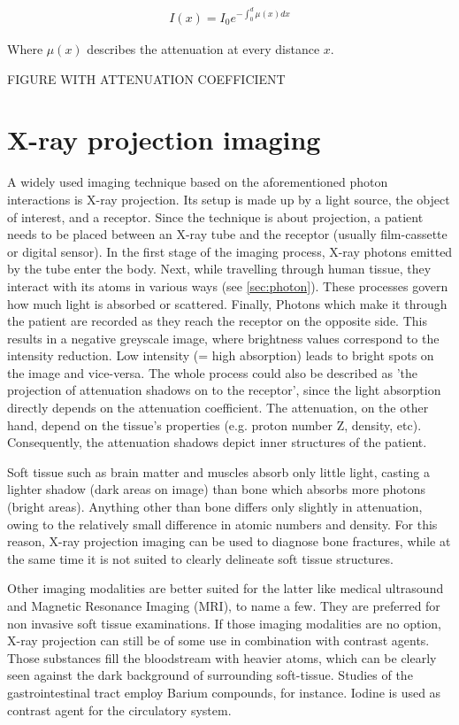 \begin{align}
\label{eq:mu_int}
I(x) = I_0 e^{- \int_{0}^{d} \mu(x)dx}
\end{align}

Where $\mu(x)$ describes the attenuation at every distance $x$.

FIGURE WITH ATTENUATION COEFFICIENT



\section{X-ray projection imaging}
A widely used imaging technique based on the aforementioned photon interactions is X-ray projection.
Its setup is made up by a light source, the object of interest, and a receptor.
Since the technique is about projection, a patient needs to be placed between an X-ray tube and the receptor (usually film-cassette or digital sensor).
In the first stage of the imaging process, X-ray photons emitted by the tube enter the body.
Next, while travelling through human tissue, they interact with its atoms in various ways (see \ref{sec:photon}).
These processes govern how much light is absorbed or scattered.
Finally, Photons which make it through the patient are recorded as they reach the receptor on the opposite side.
This results in a negative greyscale image, where brightness values correspond to the intensity reduction.
Low intensity (= high absorption) leads to bright spots on the image and vice-versa.
The whole process could also be described as 'the projection of attenuation shadows on to the receptor', since the light absorption directly depends on the attenuation coefficient. The attenuation, on the other hand, depend on the tissue's properties (e.g. proton number Z, density, etc).
Consequently, the attenuation shadows depict inner structures of the patient.

Soft tissue such as brain matter and muscles absorb only little light, casting a lighter shadow (dark areas on image) than bone which absorbs more photons (bright areas).
Anything other than bone differs only slightly in attenuation, owing to the relatively small difference in atomic numbers and density.
For this reason, X-ray projection imaging can be used to diagnose bone fractures, while at the same time it is not suited to clearly delineate soft tissue structures.
 
Other imaging modalities are better suited for the latter like medical ultrasound and Magnetic Resonance Imaging (MRI), to name a few. They are preferred for non invasive soft tissue examinations.
If those imaging modalities are no option, X-ray projection can still be of some use in combination with contrast agents. Those substances fill the bloodstream with heavier atoms, which can be clearly seen against the dark background of surrounding soft-tissue. Studies of the gastrointestinal tract employ Barium compounds, for instance. Iodine is used as contrast agent for the circulatory system.

